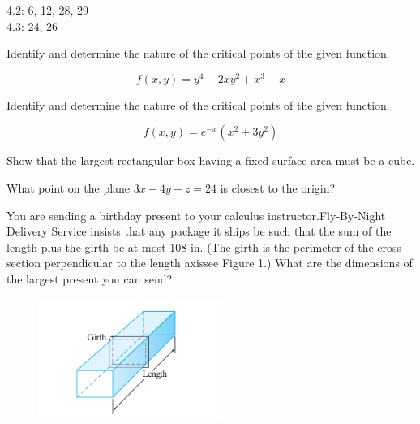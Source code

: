 \documentclass[11pt,letterpaper,boxed]{pset}
\begin{document}
    \begin{center}
    	4.2: 6, 12, 28, 29 \\
    	4.3: 24, 26
    \end{center}
    
    \begin{problem} [4.2.6]
    	Identify and determine the nature of the critical points of the given function.
    
    	\[ f(x,y) = y^4 - 2xy^2+x^3 -x \]
    
    \end{problem}
    \newpage
    
    
    \begin{problem} [4.2.12]
    	Identify and determine the nature of the critical points of the given function.
    
    	\[f(x,y) = e^{-x}(x^2+3y^2)\]
    
    \end{problem}
    \newpage
    
    
    \begin{problem} [4.2.28]
    	Show that the largest rectangular box having a fixed surface area must be a cube.
    
    \end{problem}
    \newpage
    
    
    
    \begin{problem} [4.2.29]
    	What point on the plane $3x − 4y − z = 24$ is closest to the origin?
    
    \end{problem}
    \newpage
    
    
    \begin{problem} [4.3.24]
    	You are sending a birthday present to your calculus instructor.Fly-By-Night Delivery Service insists that any package it ships be such that the sum of the length plus the girth be at most 108 in. (The girth is the perimeter of the cross section perpendicular to the length axis\textemdash see Figure 1.) What are the dimensions of the largest present you can send?
    
    
    \end{problem}
    
    \begin{figure}[h!]
        \begin{center}
            \includegraphics[width=60mm]{box.png}
        \end{center}
    \end{figure}
    
\end{document}
